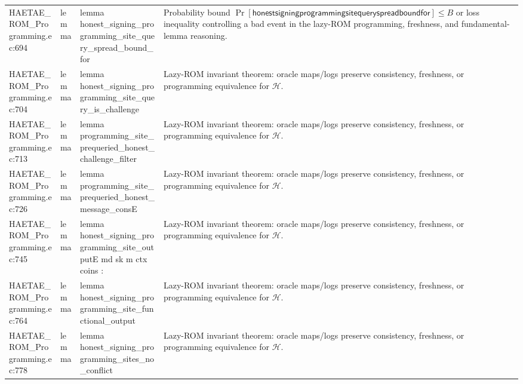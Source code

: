 \documentclass[10pt]{article}
\begin{document}
\begin{longtable}{L{0.11\textwidth}L{0.055\textwidth}L{0.385\textwidth}L{0.41\textwidth}}
HAETAE\_\allowbreak{}ROM\_\allowbreak{}Programming.\allowbreak{}ec:\allowbreak{}694 & lemma & {\ttfamily\scriptsize lemma honest\_\allowbreak{}signing\_\allowbreak{}programming\_\allowbreak{}site\_\allowbreak{}query\_\allowbreak{}spread\_\allowbreak{}bound\_\allowbreak{}for} & Probability bound $\Pr[\mathsf{honestsigningprogrammingsitequeryspreadboundfor}]\le B$ or loss inequality controlling a bad event in the lazy-ROM programming, freshness, and fundamental-lemma reasoning. \\
HAETAE\_\allowbreak{}ROM\_\allowbreak{}Programming.\allowbreak{}ec:\allowbreak{}704 & lemma & {\ttfamily\scriptsize lemma honest\_\allowbreak{}signing\_\allowbreak{}programming\_\allowbreak{}site\_\allowbreak{}query\_\allowbreak{}is\_\allowbreak{}challenge} & Lazy-ROM invariant theorem: oracle maps/logs preserve consistency, freshness, or programming equivalence for $\mathcal H$. \\
HAETAE\_\allowbreak{}ROM\_\allowbreak{}Programming.\allowbreak{}ec:\allowbreak{}713 & lemma & {\ttfamily\scriptsize lemma programming\_\allowbreak{}site\_\allowbreak{}prequeried\_\allowbreak{}honest\_\allowbreak{}challenge\_\allowbreak{}filter} & Lazy-ROM invariant theorem: oracle maps/logs preserve consistency, freshness, or programming equivalence for $\mathcal H$. \\
HAETAE\_\allowbreak{}ROM\_\allowbreak{}Programming.\allowbreak{}ec:\allowbreak{}726 & lemma & {\ttfamily\scriptsize lemma programming\_\allowbreak{}site\_\allowbreak{}prequeried\_\allowbreak{}honest\_\allowbreak{}message\_\allowbreak{}consE} & Lazy-ROM invariant theorem: oracle maps/logs preserve consistency, freshness, or programming equivalence for $\mathcal H$. \\
HAETAE\_\allowbreak{}ROM\_\allowbreak{}Programming.\allowbreak{}ec:\allowbreak{}745 & lemma & {\ttfamily\scriptsize lemma honest\_\allowbreak{}signing\_\allowbreak{}programming\_\allowbreak{}site\_\allowbreak{}outputE md sk m ctx coins :} & Lazy-ROM invariant theorem: oracle maps/logs preserve consistency, freshness, or programming equivalence for $\mathcal H$. \\
HAETAE\_\allowbreak{}ROM\_\allowbreak{}Programming.\allowbreak{}ec:\allowbreak{}764 & lemma & {\ttfamily\scriptsize lemma honest\_\allowbreak{}signing\_\allowbreak{}programming\_\allowbreak{}site\_\allowbreak{}functional\_\allowbreak{}output} & Lazy-ROM invariant theorem: oracle maps/logs preserve consistency, freshness, or programming equivalence for $\mathcal H$. \\
HAETAE\_\allowbreak{}ROM\_\allowbreak{}Programming.\allowbreak{}ec:\allowbreak{}778 & lemma & {\ttfamily\scriptsize lemma honest\_\allowbreak{}signing\_\allowbreak{}programming\_\allowbreak{}sites\_\allowbreak{}no\_\allowbreak{}conflict} & Lazy-ROM invariant theorem: oracle maps/logs preserve consistency, freshness, or programming equivalence for $\mathcal H$. \\

\end{longtable}
\end{document}
